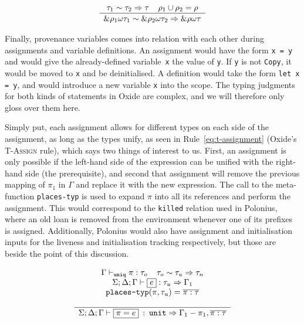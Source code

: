\documentclass[11pt,a4paper,twoside,openany]{report}
\newcommand{\InRust}[1]{\texttt{#1}}
\newcommand{\InDatalog}[1]{\texttt{#1}}
\newcommand{\expression}[1]{\boxed{#1}}
\newcommand{\ntyperule}[2]{\begin{array}{c}#1\\\hline\raisebox{1pt}{\strut}#2\end{array}}
\begin{document}
\begin{equation}\label{eq:u-ref}
  \ntyperule{
    \tau_1 \sim \tau_2 \Rightarrow \tau \:\:\:\:\: \rho_1 \cup \rho_2 = \rho}
  {
    \&\rho_1 \omega \tau_1 \sim \& \rho_2  \omega \tau_2 \Rightarrow \&\rho \omega \tau
  }
\end{equation}

Finally, provenance variables comes into relation with each other during
assignments and variable definitions. An assignment would have the form
\InRust{x = y} and would give the already-defined variable~\InRust{x} the value
of \InRust{y}. If \InRust{y} is not \InRust{Copy}, it would be moved to
\InRust{x} and be deinitialised. A definition would take the form \InRust{let x
  = y}, and would introduce a new variable \InRust{x} into the scope. The typing
judgments for both kinds of statements in Oxide are complex, and we will
therefore only gloss over them here.

Simply put, each assignment allows for different types on each side of the
assignment, as long as the types unify, as seen in Rule~\eqref{eq:t-assignment}
(Oxide's \textsc{T-Assign} rule), which says two things of interest to us.
First, an assignment is only possible if the left-hand side of the expression
can be unified with the right-hand side (the prerequisite), and second that
assignment will remove the previous mapping of $\pi_1$ in $\Gamma$ and replace
it with the new expression. The call to the meta-function \texttt{places-typ} is
used to expand $\pi$ into all its references and perform the assignment. This
would correspond to the \InDatalog{killed} relation used in Polonius, where an
old loan is removed from the environment whenever one of its prefixes is
assigned. Additionally, Polonius would also have assignment and initialisation
inputs for the liveness and initialisation tracking respectively, but those are
beside the point of this discussion.

\begin{equation}\label{eq:t-assignment}
  \ntyperule{
    \Gamma \vdash_{\texttt{uniq}} \pi : \tau_o \:\:\:\:\:
    \tau_o \sim \tau_u \Rightarrow \tau_n \\
    \Sigma ; \Delta ; \Gamma \vdash \expression{e} : \tau_u \Rightarrow \Gamma_1 \\
    \texttt{places-typ}(\pi, \tau_u) = \overline{\pi : \tau} \\
  }
  {
    \Sigma ; \Delta ; \Gamma \vdash \expression{\pi = e} \: : \: \texttt{unit} \Rightarrow \Gamma_1 - \pi_1, \overline{\pi : \tau}
  }
\end{equation}
\end{document}
